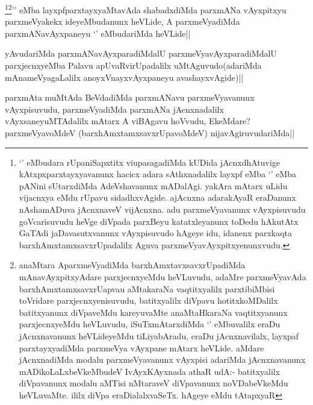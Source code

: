 \begin{artha}
\footnote{`\stext' eMbudara rUpaniSapxtitx viupasagadiMda kUDida jAcnxdhAtuvige kAtxpxparxtayxyavanunx hacicx adara sAthxnadalilx layxpf eMba `\stext' eMba pANini sUtarxdiMda AdeVshavanunx mADalAgi. yakAra mAtarx uLidu vijacnxya eMdu rUpavu sidadhxvAgide. ajAcnxna adarakAyaR eraDanunx nAshamADuva jAcnxnaveV vijAcnxna. adu parxmeVyavanunx vAyxpisuvudu goVcarisuvudu heVge diVpada parxBeyu katatxleyanunx toDedu hAkutAtx GaTAdi jaDavasutxvanunx vAyxpisuvudo hAgeye idu, idanenx parxkaqta barxhAmxtamxsavxrUpadalilx Aguva parxmeVyavAyxpitxyenunxvudu.}\footnote{anaMtara AparxmeVyadiMda barxhAmxtavxsavxrUpadiMda mAnavAyxpitxyAdare parxjecnxyeMdu heVLuvudu, adaMre parxmeVyavAda barxhAmxtamxsavxrUapvau aMtakaraNa vaqtitxyalilx parxtibiMbisi  toVridare parxjecnxyenisuvudu, batitxyalilx diVpavu hotitxkoMDalilx batitxyanunx diVpaveMdu kareyuvaMte anaMtaHkaraNa vaqtitxyanunx parxjecnxyeMdu heVLuvudu, iSuTxmAtarxdiMda `\stext' eMbuvalilx eraDu jAcnxnavanunx heVLideyeMdu tiLiyabAradu, eraDu jAcnxnavilalx, layxpaf parxtayxyadiMda parxmeVya vAyxpane mAtarx heVLide. aMdare jAcnxnadiMda modalu parxmeVyavanunx vAyxpisi adariMda jAcnxnavanunx mADikoLaLxbeVkeMbudeV IvAyxKAyxnada athaR udA:- batitxyalilx diVpavanunx modalu aMTisi nMtaraveV diVpavanunx noVDabeVkeMdu heVLuvaMte. ililx diVpa eraDialalxvaSeTx. hAgeye eMdu tAtapxyaR }'\stext' eMba layxpfparxtayxyaMtavAda shabadxdiMda parxmANa vAyxpitxyu parxmeVyakekx ideyeMbudanunx heVLide, A parxmeVyadiMda parxmANavAyxpaneyu `\stext' eMbudariMda heVLide||
\end{artha}


\begin{artha}
yAvudariMda parxmANavAyxparadiMdalU parxmeVyavAyxparadiMdalU parxjecnxyeMba Palavu apUvaRvirUpadalilx uMtAguvudo(adariMda mAnameVyagaLalilx anoyxVnayxvAyxpaneyu avashayxvAgide)||
\end{artha}



\begin{artha}
parxmAta muMtAda BeVdadiMda parxmANavu parxmeVyavanunx vAyxpisuvudu, parxmeVyadiMda parxmANa jAcnxnadalilx vAyxsaneyuMTAdalilx mAtarx A viBAgavu hoVvudu, EkeMdare? parxmeVyavoMdeV (barxhAmxtamxsavxrUpavoMdeV) nijavAgiruvudariMda||
\end{artha}

